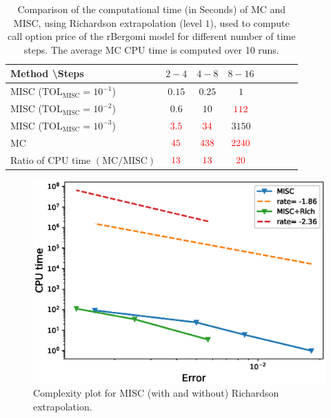 \begin{table}[h!]
	\centering
	\begin{tabular}{l*{6}{c}r}
		Method \textbackslash  Steps            & $2-4$ & $4-8$ & $8-16$ &   \\
		\hline
		MISC ($\text{TOL}_{\text{MISC}}=10^{-1}$)   & $0.15$ & $0.25$ & $1$  \\
		MISC ($\text{TOL}_{\text{MISC}}=10^{-2}$)   & $0.6$ & $10$ & ${\color{red}112}$  \\
		MISC ($\text{TOL}_{\text{MISC}}=10^{-3}$)  & ${\color{red}3.5}$ & ${\color{red}34}$ & $3150$ \\
		\hline	
			MC  & ${\color{red}45}$  & ${\color{red}438}$  & ${\color{red}2240}$ \\
			
			\hline
				Ratio of CPU time  $\left(\text{MC}/ \text{MISC} \right)$   & ${\color{red}13}$  & ${\color{red}13}$  & ${\color{red}20}$ \\

		\hline
	\end{tabular}
	\caption{Comparison of the computational time (in Seconds) of  MC and MISC, using Richardson extrapolation (level $1$), used to compute call option price of the rBergomi model for different number of time steps. The
average MC CPU time is computed over 10 runs.}
	\label{Comparsion of the computational time of  MC and MISC, using Richardson extrapolation (level $1$), used to compute Call option price of rBergomi model for different number of time steps. Case set $3$ parameters}
\end{table}

\FloatBarrier


	\begin{figure}[h!]
	\centering
	\includegraphics[width=0.5\linewidth]{./figures/rBergomi_Complexity_rates/set5/error_vs_time_set5_comparison}
	
	\caption{Complexity plot for  MISC (with and without) Richardson extrapolation.}
	\label{fig:Complexity plot for  MISC for case set $3$ parameters, comparison}
\end{figure}


